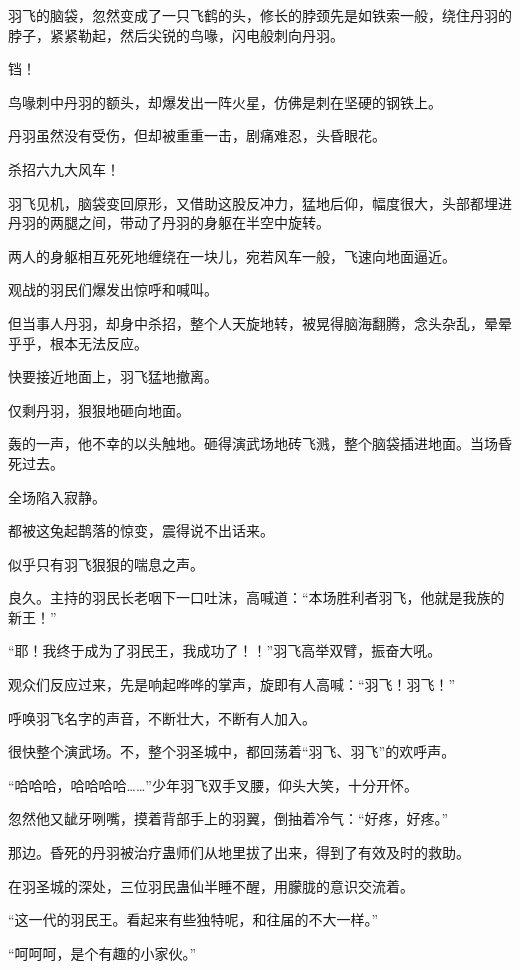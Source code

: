 \begin{this_body}
羽飞的脑袋，忽然变成了一只飞鹤的头，修长的脖颈先是如铁索一般，绕住丹羽的脖子，紧紧勒起，然后尖锐的鸟喙，闪电般刺向丹羽。

铛！

鸟喙刺中丹羽的额头，却爆发出一阵火星，仿佛是刺在坚硬的钢铁上。

丹羽虽然没有受伤，但却被重重一击，剧痛难忍，头昏眼花。

杀招六九大风车！

羽飞见机，脑袋变回原形，又借助这股反冲力，猛地后仰，幅度很大，头部都埋进丹羽的两腿之间，带动了丹羽的身躯在半空中旋转。

两人的身躯相互死死地缠绕在一块儿，宛若风车一般，飞速向地面逼近。

观战的羽民们爆发出惊呼和喊叫。

但当事人丹羽，却身中杀招，整个人天旋地转，被晃得脑海翻腾，念头杂乱，晕晕乎乎，根本无法反应。

快要接近地面上，羽飞猛地撤离。

仅剩丹羽，狠狠地砸向地面。

轰的一声，他不幸的以头触地。砸得演武场地砖飞溅，整个脑袋插进地面。当场昏死过去。

全场陷入寂静。

都被这兔起鹊落的惊变，震得说不出话来。

似乎只有羽飞狠狠的喘息之声。

良久。主持的羽民长老咽下一口吐沫，高喊道：“本场胜利者羽飞，他就是我族的新王！”

“耶！我终于成为了羽民王，我成功了！！”羽飞高举双臂，振奋大吼。

观众们反应过来，先是响起哗哗的掌声，旋即有人高喊：“羽飞！羽飞！”

呼唤羽飞名字的声音，不断壮大，不断有人加入。

很快整个演武场。不，整个羽圣城中，都回荡着“羽飞、羽飞”的欢呼声。

“哈哈哈，哈哈哈哈……”少年羽飞双手叉腰，仰头大笑，十分开怀。

忽然他又龇牙咧嘴，摸着背部手上的羽翼，倒抽着冷气：“好疼，好疼。”

那边。昏死的丹羽被治疗蛊师们从地里拔了出来，得到了有效及时的救助。

在羽圣城的深处，三位羽民蛊仙半睡不醒，用朦胧的意识交流着。

“这一代的羽民王。看起来有些独特呢，和往届的不大一样。”

“呵呵呵，是个有趣的小家伙。”


\end{this_body}
